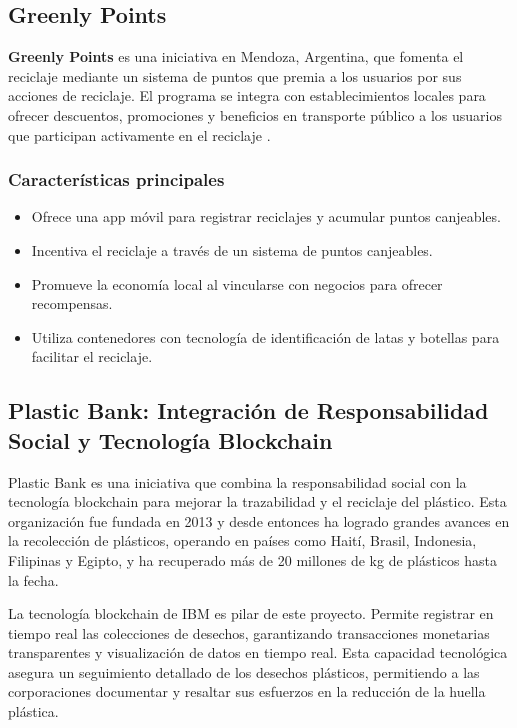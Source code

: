 \documentclass[main.tex]{subfiles}
\begin{document}
\subsection{Greenly Points}
\textbf{Greenly Points} es una iniciativa en Mendoza, Argentina, que fomenta el reciclaje mediante un sistema de puntos que premia a los usuarios por sus acciones de reciclaje. El programa se integra con establecimientos locales para ofrecer descuentos, promociones y beneficios en transporte público a los usuarios que participan activamente en el reciclaje \cite{greenlypoints2024}.

\subsubsection*{Características principales}
\begin{itemize}
    \item Ofrece una app móvil para registrar reciclajes y acumular puntos canjeables.
    \item Incentiva el reciclaje a través de un sistema de puntos canjeables.
    \item Promueve la economía local al vincularse con negocios para ofrecer recompensas.
    \item Utiliza contenedores con tecnología de identificación de latas y botellas para facilitar el reciclaje.
\end{itemize}

\subsection{Plastic Bank: Integración de Responsabilidad Social y Tecnología Blockchain}

Plastic Bank es una iniciativa que combina la responsabilidad social con la tecnología blockchain para mejorar la trazabilidad y el reciclaje del plástico. Esta organización fue fundada en 2013 y desde entonces ha logrado grandes avances en la recolección de plásticos, operando en países como Haití, Brasil, Indonesia, Filipinas y Egipto, y ha recuperado más de 20 millones de kg de plásticos hasta la fecha.

La tecnología blockchain de IBM es pilar de este proyecto. Permite registrar en tiempo real las colecciones de desechos, garantizando transacciones monetarias transparentes y visualización de datos en tiempo real. Esta capacidad tecnológica asegura un seguimiento detallado de los desechos plásticos, permitiendo a las corporaciones documentar y resaltar sus esfuerzos en la reducción de la huella plástica.
\end{document}
